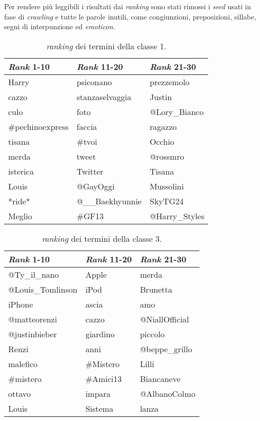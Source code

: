 Per rendere più leggibili i risultati dai \textit{ranking} sono stati rimossi i \textit{seed} usati in fase di \textit{crawling} e tutte le parole inutili, come congiunzioni, preposizioni, sillabe, 
segni di interpunzione ed \textit{emoticon}.

\begin{table}[ht]
\centering
\begin{tabular}{|l|l|l|}
\hline
\textit{Rank} 1-10        & \textit{Rank} 11-20        & \textit{Rank} 21-30      \\ \hline
Harry            & psiconano         & prezzemolo          \\
cazzo            & stanzaselvaggia   & Justin      \\
culo             & foto              & @Lory\_Bianco          \\
\#pechinoexpress & faccia            & ragazzo \\
tisana           & \#tvoi            & Occhio          \\
merda            & tweet             & @rossmro \\
isterica         & Twitter           & Tisana        \\
Louis            & @GayOggi          & Mussolini          \\
*ride*           & @\_\_Baekhyunnie  & SkyTG24       \\
Meglio           & \#GF13            & @Harry\_Styles       \\ \hline

\end{tabular}
\caption{\textit{ranking} dei termini della classe 1.}
\label{rankclass1}
\end{table}

\begin{table}[ht]
\centering
\begin{tabular}{|l|l|l|}
\hline
\textit{Rank} 1-10         & \textit{Rank} 11-20 & \textit{Rank} 21-30     \\ \hline
@Ty\_il\_nano     & Apple      & merda          \\
@Louis\_Tomlinson & iPod       & Brunetta       \\
iPhone            & ascia      & amo            \\
@matteorenzi      & cazzo      & @NiallOfficial \\
@justinbieber     & giardino   & piccolo        \\
Renzi             & anni       & @beppe\_grillo \\
malefico          & \#Mistero  & Lilli          \\
\#mistero         & \#Amici13  & Biancaneve     \\
ottavo            & impara     & @AlbanoColmo   \\
Louis             & Sistema    & lanza          \\ \hline
\end{tabular}
\caption{\textit{ranking} dei termini della classe 3.}
\label{rankclass3}
\end{table}

